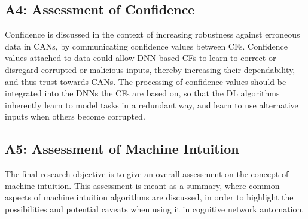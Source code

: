 			\subsection*{A4: Assessment of Confidence}
			
				Confidence is discussed in the context of increasing robustness against erroneous data in \acp{CAN}, by communicating confidence values between \acp{CF}.
				Confidence values attached to data could allow \ac{DNN}-based \acp{CF} to learn to correct or disregard corrupted or malicious inputs, thereby increasing their dependability, and thus trust towards \acp{CAN}.
				The processing of confidence values should be integrated into the \acp{DNN} the \acp{CF} are based on, so that the \ac{DL} algorithms inherently learn to model tasks in a redundant way, and learn to use alternative inputs when others become corrupted.
			
			\subsection*{A5: Assessment of Machine Intuition}
			
				The final research objective is to give an overall assessment on the concept of machine intuition.
				This assessment is meant as a summary, where common aspects of machine intuition algorithms are discussed, in order to highlight the possibilities and potential caveats when using it in cognitive network automation.
				
